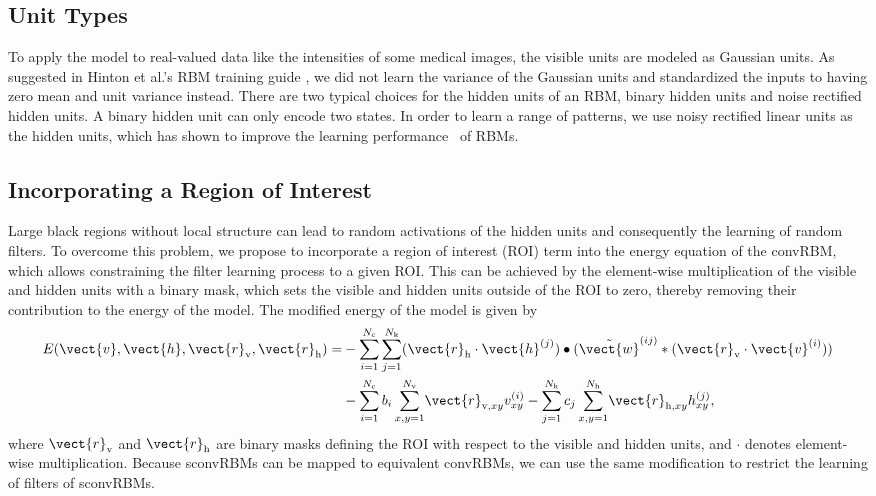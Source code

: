 \subsection{Unit Types}

To apply the model to real-valued data like the intensities of some medical
images, the visible units are modeled as Gaussian units. As suggested in Hinton
et al.'s RBM training guide \citep{hinton2010a}, we did not learn the variance
of the Gaussian units and standardized the inputs to having zero mean and unit
variance instead. There are two typical choices for the hidden units of an RBM,
binary hidden units and noise rectified hidden units. A binary hidden unit can
only encode two states. In order to learn a range of patterns, we use noisy
rectified linear units as the hidden units, which has shown to improve the
learning performance~\cite{nair2010} of RBMs.

\subsection{Incorporating a Region of Interest}

Large black regions without local structure can lead to random activations of
the hidden units and consequently the learning of random filters. To overcome
this problem, we propose to incorporate a region of interest (ROI) term into the
energy equation of the convRBM, which allows constraining the filter learning
process to a given ROI. This can be achieved by the element-wise multiplication
of the visible and hidden units with a binary mask, which sets the visible and
hidden units outside of the ROI to zero, thereby removing their contribution to
the energy of the model. The modified energy of the model is given by
\begin{align} 
\nonumber
E(\vect{v},\vect{h}, \vect{r}_\text{v}, \vect{r}_\text{h}) =
&-\sum_{i=1}^{N_\text{c}} \sum_{j=1}^{N_\text{k}}
(\vect{r}_\text{h} \cdot \vect{h}^{(j)}) \bullet
(\tilde{\vect{w}}^{(ij)} * (\vect{r}_\text{v} \cdot \vect{v}^{(i)}))\\
&- \sum_{i=1}^{N_\text{c}}b_i\sum_{x,y = 1}^{N_\text{v}}%
\!\vect{r}_{\text{v},xy}v_{xy}^{(i)}
- \sum_{j=1}^{N_\text{k}}c_j\sum_{x,y = 1}^{N_\text{h}}%
\!\vect{r}_{\text{h},xy}h_{xy}^{(j)},
\end{align}
where $\vect{r}_\text{v}$ and $\vect{r}_\text{h}$ are binary masks defining the
ROI with respect to the visible and hidden units, and $\cdot$ denotes
element-wise multiplication. Because sconvRBMs can be mapped to equivalent
convRBMs, we can use the same modification to restrict the learning of filters
of sconvRBMs.

